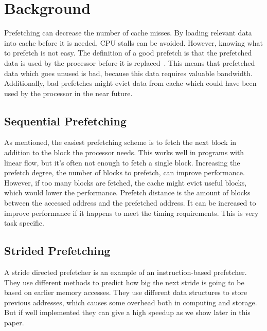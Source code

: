 \section{Background} %



Prefetching can decrease the number of cache misses. By loading
relevant data into cache before it is needed, CPU stalls can be
avoided. However, knowing what to prefetch is not easy. The definition
of a good prefetch is that the prefetched data is used by the
processor before it is
replaced~\cite{srinivasan_davidson_tyson_2004}. This means that
prefetched data which goes unused is bad, because this data requires
valuable bandwidth. Additionally, bad prefetches might evict data from
cache which could have been used by the processor in the near future.

\subsection{Sequential Prefetching}

As mentioned, the easiest prefetching scheme is to fetch the next
block in addition to the block the processor needs. This works well in
programs with linear flow, but it's often not enough to fetch a single
block. Increasing the prefetch degree, the number of blocks to
prefetch, can improve performance. However, if too many blocks are
fetched, the cache might evict useful blocks, which would lower the
performance. Prefetch distance is the amount of blocks between the
accessed address and the prefetched address. It can be increased to
improve performance if it happens to meet the timing requirements.
This is very task specific. 

\subsection{Strided Prefetching}

A stride directed prefetcher is an example of an instruction-based
prefetcher. They use different methods to predict how big the next
stride is going to be based on earlier memory accesses. They use
different data structures to store previous addresses, which causes
some overhead both in computing and storage. But if well implemented
they can give a high speedup as we show later in this paper.

